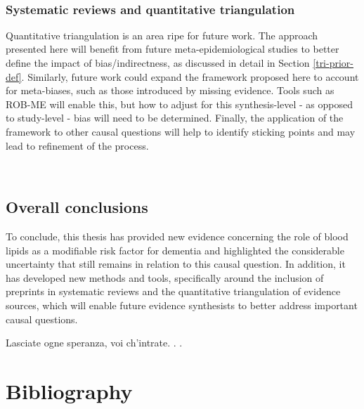 \documentclass[a4paper, twoside]{templates/ociamthesis}
\begin{document}
~

\hypertarget{systematic-reviews-and-quantitative-triangulation}{%
\subsection{Systematic reviews and quantitative triangulation}\label{systematic-reviews-and-quantitative-triangulation}}

Quantitative triangulation is an area ripe for future work. The approach presented here will benefit from future meta-epidemiological studies to better define the impact of bias/indirectness, as discussed in detail in Section \ref{tri-prior-def}. Similarly, future work could expand the framework proposed here to account for meta-biases, such as those introduced by missing evidence. Tools such as ROB-ME will enable this, but how to adjust for this synthesis-level - as opposed to study-level - bias will need to be determined. Finally, the application of the framework to other causal questions will help to identify sticking points and may lead to refinement of the process.

~

\hypertarget{overall-conclusions}{%
\section{Overall conclusions}\label{overall-conclusions}}

To conclude, this thesis has provided new evidence concerning the role of blood lipids as a modifiable risk factor for dementia and highlighted the considerable uncertainty that still remains in relation to this causal question. In addition, it has developed new methods and tools, specifically around the inclusion of preprints in systematic reviews and the quantitative triangulation of evidence sources, which will enable future evidence synthesists to better address important causal questions.

\begin{savequote}
Lasciate ogne speranza, voi ch'intrate. . .
\end{savequote}

\hypertarget{bibliography}{%
\chapter{Bibliography}\label{bibliography}}
\end{document}

